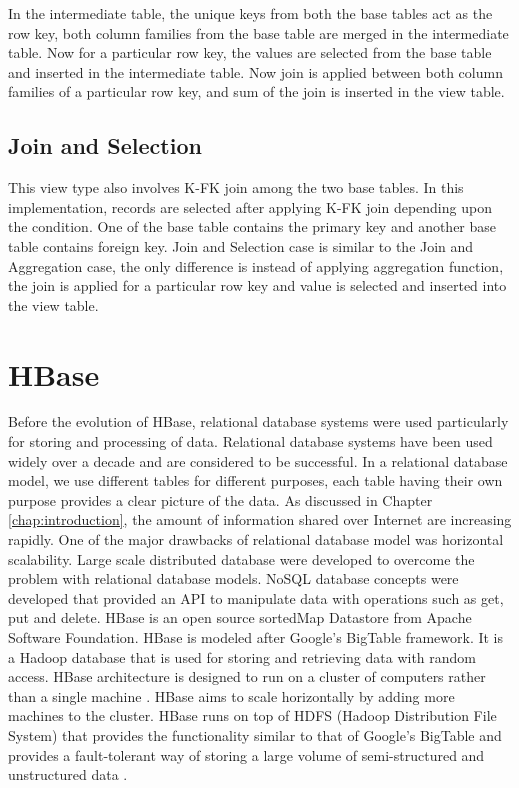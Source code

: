 \documentclass[11pt,a4paper,bibtotoc,idxtotoc,headsepline,footsepline,footexclude,BCOR12mm,DIV13]{scrbook}
\begin{document}
In the intermediate table, the unique keys from both the base tables act as the row key, both column families from the base table are merged in the intermediate table. Now for a particular row key, the values are selected from the base table and inserted in the intermediate table. Now join is applied between both column families of a particular row key, and sum of the join is inserted in the view table.  


\subsection{Join and Selection}
This view type also involves K-FK join among the two base tables. In this implementation, records are selected after applying K-FK join depending upon the condition. One of the base table contains the primary key and another base table contains foreign key. Join and Selection case is similar to the Join and Aggregation case, the only difference is instead of applying aggregation function, the join is applied for a particular row key and value is selected and inserted into the view table. 

\newpage
\section{HBase}
\label{sec:hbase}

Before the evolution of HBase, relational database systems were used particularly for storing and processing of data. Relational database systems have been used widely over a decade and are considered to be successful. In a relational database model, we use different tables for different purposes, each table having their own purpose provides  
a clear picture of the data. As discussed in Chapter \ref{chap:introduction}, the amount of information shared over Internet are increasing rapidly. One of the major drawbacks of relational database model was horizontal scalability. Large scale distributed database were developed to overcome the problem with relational database models. NoSQL database concepts were developed that provided an API to manipulate data with operations such as get, put and delete. HBase is an open source sortedMap Datastore from Apache Software Foundation. HBase is modeled after Google's BigTable framework. It is a Hadoop database that is used for storing and retrieving data with random access. HBase architecture is designed to run on a cluster of computers rather than a single machine \cite{coprocessor:detail}. HBase aims to scale horizontally by adding more machines to the cluster. HBase runs on top of HDFS (Hadoop Distribution File System) that provides the functionality similar to that of Google's BigTable and provides a fault-tolerant way of storing a large volume of semi-structured and unstructured data \cite{bigdata:analysis}.
\end{document}
